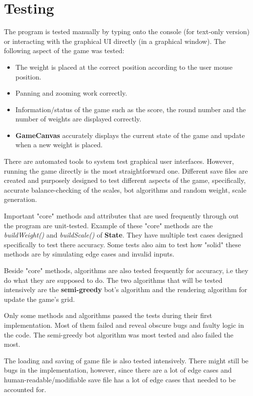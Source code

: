 \documentclass[12pt]{article}
\begin{document}
\section{Testing}

The program is tested manually by typing onto the console (for text-only
version) or interacting with the graphical UI directly (in a graphical window).
The following aspect of the game was tested:
\begin{itemize}
  \item The weight is placed at the correct position according to the user mouse
    position.
  \item Panning and zooming work correctly.
  \item Information/status of the game such as the score, the round number and
    the number of weights are displayed correctly.
  \item \textbf{GameCanvas} accurately displays the current state of the game
    and update when a new weight is placed.
\end{itemize}

There are automated tools to system test graphical user interfaces. However,
running the game directly is the most straightforward one. Different save files
are created and purposely designed to test different aspects of the game,
specifically, accurate balance-checking of the scales, bot algorithms and random
weight, scale generation. 

Important "core" methods and attributes that are used frequently through out the
program are unit-tested. Example of these "core" methods are the
\textit{buildWeight()} and \textit{buildScale()} of \textbf{State}. They have
multiple test cases designed specifically to test there accuracy. Some tests
also aim to test how "solid" these methods are by simulating edge cases and
invalid inputs.

Beside "core" methods, algorithms are also tested frequently for accuracy, i.e
they do what they are supposed to do. The two algorithms that will be tested
intensively are the \textbf{semi-greedy} bot's algorithm and the rendering
algorithm for update the game's grid. 

Only some methods and algorithms passed the tests during their first
implementation. Most of them failed and reveal obscure bugs and faulty
logic in the code. The semi-greedy bot algorithm was most tested and also failed
the most. 

The loading and saving of game file is also tested intensively. There might
still be bugs in the implementation, however, since there are a lot of edge
cases and human-readable/modifiable save file has a lot of edge cases that
needed to be accounted for.
\end{document}
